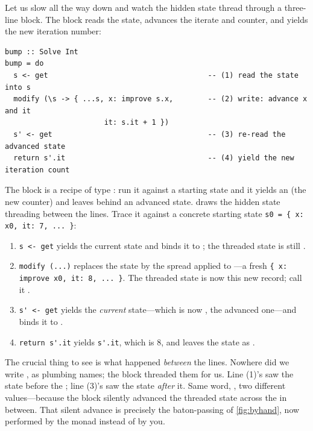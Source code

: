 Let us slow all the way down and watch the hidden state thread through a three-line
 block. The block reads the state, advances the iterate and counter, and
yields the new iteration number:

\begin{lstlisting}[style=l4style]
bump :: Solve Int
bump = do
  s <- get                                     -- (1) read the state into s
  modify (\s -> { ...s, x: improve s.x,        -- (2) write: advance x and it
                       it: s.it + 1 })
  s' <- get                                    -- (3) re-read the advanced state
  return s'.it                                 -- (4) yield the new iteration count
\end{lstlisting}

\noindent The block is a recipe of type : run it against a starting
state and it yields an  (the new counter) and leaves behind an advanced
state.  draws the hidden state threading between the lines. Trace it
against a concrete starting state
\lstinline[style=l4style]|s0 = { x: x0, it: 7, ... }|:

\begin{enumerate}[label=(\arabic*), leftmargin=*, nosep]
  \item \lstinline[style=l4style]|s <- get| yields the current state  and
  binds it to ; the threaded state is still .
  \item \lstinline[style=l4style]|modify (...)| replaces the state by the spread
  applied to ---a fresh \lstinline[style=l4style]|{ x: improve x0, it: 8, ... }|.
  The threaded state is now this new record; call it .
  \item \lstinline[style=l4style]|s' <- get| yields the \emph{current} state---which
  is now , the advanced one---and binds it to .
  \item \lstinline[style=l4style]|return s'.it| yields
  \lstinline[style=l4style]|s'.it|, which is $8$, and leaves the state as .
\end{enumerate}

\noindent The crucial thing to see is what happened \emph{between} the lines. Nowhere
did we write ,  as plumbing names; the  block threaded
them for us. Line (1)'s  saw the state before the ; line (3)'s
 saw the state \emph{after} it. Same word, , two different
values---because the  block silently advanced the threaded state across the
 in between. That silent advance is precisely the baton-passing of
\cref{fig:byhand}, now performed by the monad instead of by you.

